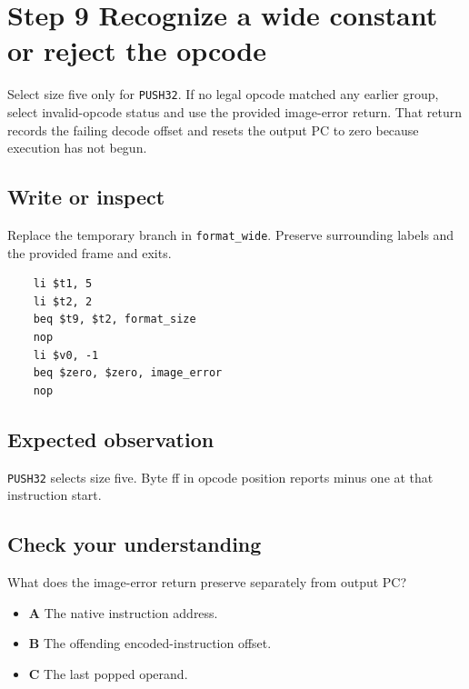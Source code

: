 \section{Step 9 Recognize a wide constant or reject the opcode}\label{vm-s09}

Select size five only for \texttt{PUSH32}. If no legal opcode matched any earlier group, select invalid-opcode status and use the provided image-error return. That return records the failing decode offset and resets the output PC to zero because execution has not begun.

\subsection{Write or inspect}
Replace the temporary branch in \texttt{format\_wide}. Preserve surrounding labels and the provided frame and exits.

\begin{verbatim}
    li $t1, 5
    li $t2, 2
    beq $t9, $t2, format_size
    nop
    li $v0, -1
    beq $zero, $zero, image_error
    nop
\end{verbatim}
\subsection{Expected observation}
\texttt{PUSH32} selects size five. Byte ff in opcode position reports minus one at that instruction start.

\subsection{Check your understanding}
What does the image-error return preserve separately from output PC?

\begin{itemize}
  \item \textbf{A} The native instruction address.
  \item \textbf{B} The offending encoded-instruction offset.
  \item \textbf{C} The last popped operand.
\end{itemize}
